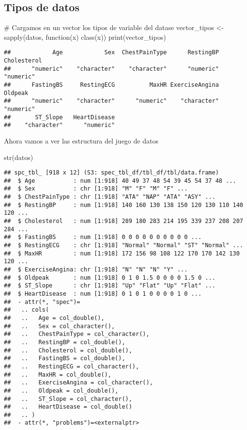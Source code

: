 \documentclass[
]{article}
\newenvironment{Shaded}{\begin{snugshade}}{\end{snugshade}}
\newcommand{\CommentTok}[1]{\textcolor[rgb]{0.50,0.62,0.50}{#1}}
\newcommand{\ControlFlowTok}[1]{\textcolor[rgb]{0.94,0.87,0.69}{#1}}
\newcommand{\FunctionTok}[1]{\textcolor[rgb]{0.94,0.94,0.56}{#1}}
\newcommand{\NormalTok}[1]{\textcolor[rgb]{0.80,0.80,0.80}{#1}}
\newcommand{\OtherTok}[1]{\textcolor[rgb]{0.94,0.94,0.56}{#1}}
\begin{document}
\hypertarget{tipos-de-datos}{%
\subsection{Tipos de datos}\label{tipos-de-datos}}

\begin{Shaded}
\begin{Highlighting}[]
\CommentTok{\# Cargamos en un vector los tipos de variable del datase}
\NormalTok{vector\_tipos }\OtherTok{\textless{}{-}} \FunctionTok{sapply}\NormalTok{(datos, }\ControlFlowTok{function}\NormalTok{(x) }\FunctionTok{class}\NormalTok{(x))}
\FunctionTok{print}\NormalTok{(vector\_tipos)}
\end{Highlighting}
\end{Shaded}

\begin{verbatim}
##            Age            Sex  ChestPainType      RestingBP    Cholesterol 
##      "numeric"    "character"    "character"      "numeric"      "numeric" 
##      FastingBS     RestingECG          MaxHR ExerciseAngina        Oldpeak 
##      "numeric"    "character"      "numeric"    "character"      "numeric" 
##       ST_Slope   HeartDisease 
##    "character"      "numeric"
\end{verbatim}

Ahora vamos a ver las estructura del juego de datos

\begin{Shaded}
\begin{Highlighting}[]
\FunctionTok{str}\NormalTok{(datos)}
\end{Highlighting}
\end{Shaded}

\begin{verbatim}
## spc_tbl_ [918 x 12] (S3: spec_tbl_df/tbl_df/tbl/data.frame)
##  $ Age           : num [1:918] 40 49 37 48 54 39 45 54 37 48 ...
##  $ Sex           : chr [1:918] "M" "F" "M" "F" ...
##  $ ChestPainType : chr [1:918] "ATA" "NAP" "ATA" "ASY" ...
##  $ RestingBP     : num [1:918] 140 160 130 138 150 120 130 110 140 120 ...
##  $ Cholesterol   : num [1:918] 289 180 283 214 195 339 237 208 207 284 ...
##  $ FastingBS     : num [1:918] 0 0 0 0 0 0 0 0 0 0 ...
##  $ RestingECG    : chr [1:918] "Normal" "Normal" "ST" "Normal" ...
##  $ MaxHR         : num [1:918] 172 156 98 108 122 170 170 142 130 120 ...
##  $ ExerciseAngina: chr [1:918] "N" "N" "N" "Y" ...
##  $ Oldpeak       : num [1:918] 0 1 0 1.5 0 0 0 0 1.5 0 ...
##  $ ST_Slope      : chr [1:918] "Up" "Flat" "Up" "Flat" ...
##  $ HeartDisease  : num [1:918] 0 1 0 1 0 0 0 0 1 0 ...
##  - attr(*, "spec")=
##   .. cols(
##   ..   Age = col_double(),
##   ..   Sex = col_character(),
##   ..   ChestPainType = col_character(),
##   ..   RestingBP = col_double(),
##   ..   Cholesterol = col_double(),
##   ..   FastingBS = col_double(),
##   ..   RestingECG = col_character(),
##   ..   MaxHR = col_double(),
##   ..   ExerciseAngina = col_character(),
##   ..   Oldpeak = col_double(),
##   ..   ST_Slope = col_character(),
##   ..   HeartDisease = col_double()
##   .. )
##  - attr(*, "problems")=<externalptr>
\end{verbatim}
\end{document}
